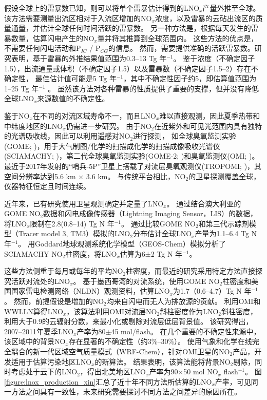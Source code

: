 假设全球上的雷暴数已知，则可以将单个雷暴估计得到的LNO$_x$产量外推至全球\citep{Chameides.1987,Huntrieser.1998,Huntrieser.2002}。
该方法需要测量出流区相对于入流区增加的NO$_x$浓度，以及雷暴的云砧出流区的质量通量，并估计全球任何时间活跃的雷暴数。
另一种方法是，根据每天发生的雷暴数量，估算闪电产生的NO$_x$量并将其推算到全球范围内\citep{Ridley.2004}。 这些方法的优点是，不需要任何闪电活动和P\textrm{$_{IC}$} / P\textrm{$_{CG}$}的信息。
然而，需要提供准确的活跃雷暴数。研究表明，基于雷暴的外推结果值范围为0.3--13 Tg 年$^{-1}$。
鉴于浓度（不确定因子1.5），出流通量或体积（不确定因子1.5）以及雷暴数（不确定因子1.5--2）存在不确定性，
最佳估计值可能是5 Tg 年$^{-1}$，其中不确定性因子约5，即估算值范围为1--25 Tg 年$^{-1}$ \citep{Chameides.1987}。
虽然该方法对各种雷暴的性质提供了重要的支撑，但并没有降低全球LNO$_x$来源数值的不确定性。

鉴于NO$_x$在不同的对流区域寿命不一，而且LNO$_x$难以直接观测，因此夏季热带和中纬度地区的LNO$_x$仍需进一步研究。
由于NO$_2$在近紫外和可见光范围内具有独特的光谱吸收线，因此可以利用遥感对NO$_2$进行探测\citep{Platt.1983}，
如全球臭氧监测实验(GOME; \citet{Burrows.1999})，用于大气制图/化学的扫描成化学的扫描成像吸收光谱仪(SCIAMACHY; \citet{Bovensmann.1999})，第二代全球臭氧监测实验(GOME-2; \citet{Callies.2000})和臭氧监测仪(OMI; \citet{Levelt.2006})。
最近于2017年发射的“哨兵-5P”卫星上搭载了对流层臭氧观测仪(TROPOMI; \citet{Veefkind.2012})，其空间分辨率达到5.6 km $\times$ 3.6 km。
与传统平台相比，NO$_2$的卫星探测覆盖全球，仪器特征恒定且时间连续。

近年来，已有研究使用卫星观测确定并定量了LNO$_x$。
\citet{Beirle.2004}通过结合澳大利亚的GOME NO$_2$数据和闪电成像传感器（Lightning Imaging Sensor，LIS）的数据，将LNO$_x$限制在2.8(0.8--14) Tg N 年$^{-1}$。
\citet{Boersma.2005}通过比较GOME NO$_2$和第三代示踪剂模型（Tracer model 3, TM3）模拟的LNO$_2$分布估计全球LNO$_x$产量为1.1--6.4 Tg N 年$^{-1}$。
\citet{Martin.2007a}用Goddard地球观测系统化学模型（GEOS-Chem）模拟分析了SCIAMACHY NO$_2$柱密度，将LNO$_x$估算为6±2 Tg N 年$^{-1}$。

这些方法侧重于每月或每年的平均NO$_2$柱密度，而最近的研究采用特定方法直接探究活跃对流处的LNO$_x$。
\citet{Beirle.2006}基于墨西哥湾的对流系统，使用GOME NO$_2$柱密度和美国国家雷电检测网络（NLDN）观测资料，估算LNO$_x$为1.7（0.6–4.7）Tg N 年$^{-1}$。
然而，前提假设是增加的NO$_2$均来自闪电而无人为排放源的贡献。
\citet{Pickering.2016} 利用OMI和WWLLN算得LNO$_x$，该算法利用OMI对流层NO$_2$斜柱密度作为LNO$_2$斜柱密度，利用大于0.9的云辐射分数，来最小化或剔除对流层低层背景值。
该研究得出，2007--2011年夏季LNO$_x$产率为80$\pm$45 mol/flash。
在几个重要的不确定性来源中，该区域中的背景NO$_x$存在显著的不确定性（约3\%--30\%）。
\citet{Zhang.2020b}使用气象和化学在线完全耦合的新一代区域空气质量模式（WRF-Chem），针对OMI卫星的NO$_2$产品，开发适用于估算污染地区LNO$_x$的新算法。
结果表明，该算法能将背景NO$_2$剔除，同时考虑处于云下的LNO$_2$，得出北美地区LNO$_x$产率为90$\times$50 mol NO$_x$ flash$^{-1}$。
图\ref{figure:lnox_production_xin}汇总了近十年不同方法所估算的LNO$_x$产率，可见同一方法之间具有一致性，未来研究需要探讨不同方法之间差异的原因所在。

